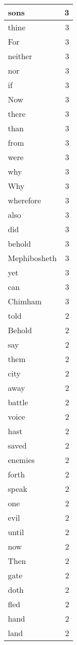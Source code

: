 \begin{center}
\begin{longtable}{l|r}
sons & 3 \\ \hline
thine & 3 \\ \hline
For & 3 \\ \hline
neither & 3 \\ \hline
nor & 3 \\ \hline
if & 3 \\ \hline
Now & 3 \\ \hline
there & 3 \\ \hline
than & 3 \\ \hline
from & 3 \\ \hline
were & 3 \\ \hline
why & 3 \\ \hline
Why & 3 \\ \hline
wherefore & 3 \\ \hline
also & 3 \\ \hline
did & 3 \\ \hline
behold & 3 \\ \hline
Mephibosheth & 3 \\ \hline
yet & 3 \\ \hline
can & 3 \\ \hline
Chimham & 3 \\ \hline
told & 2 \\ \hline
Behold & 2 \\ \hline
say & 2 \\ \hline
them & 2 \\ \hline
city & 2 \\ \hline
away & 2 \\ \hline
battle & 2 \\ \hline
voice & 2 \\ \hline
hast & 2 \\ \hline
saved & 2 \\ \hline
enemies & 2 \\ \hline
forth & 2 \\ \hline
speak & 2 \\ \hline
one & 2 \\ \hline
evil & 2 \\ \hline
until & 2 \\ \hline
now & 2 \\ \hline
Then & 2 \\ \hline
gate & 2 \\ \hline
doth & 2 \\ \hline
fled & 2 \\ \hline
hand & 2 \\ \hline
land & 2 \\ \hline

\end{longtable}
\end{center}

